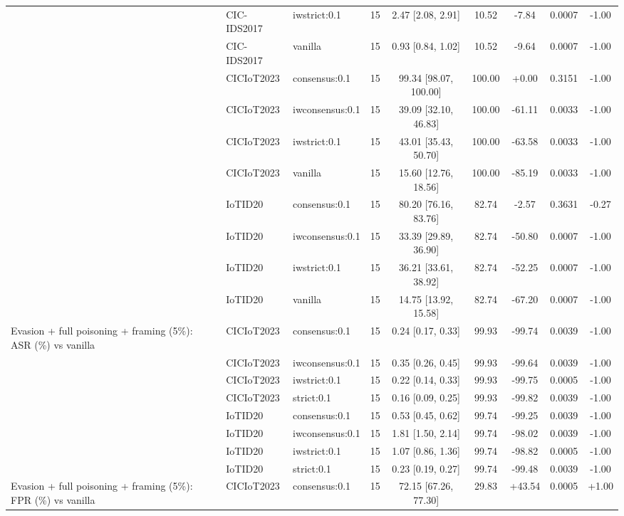 \begin{table}[t]
\begin{tabular}{lllcccccc}
 & CIC-IDS2017 & iwstrict:0.1 & 15 & 2.47 [2.08, 2.91] & 10.52 & -7.84 & 0.0007 & -1.00 \\
 & CIC-IDS2017 & vanilla & 15 & 0.93 [0.84, 1.02] & 10.52 & -9.64 & 0.0007 & -1.00 \\
 & CICIoT2023 & consensus:0.1 & 15 & 99.34 [98.07, 100.00] & 100.00 & +0.00 & 0.3151 & -1.00 \\
 & CICIoT2023 & iwconsensus:0.1 & 15 & 39.09 [32.10, 46.83] & 100.00 & -61.11 & 0.0033 & -1.00 \\
 & CICIoT2023 & iwstrict:0.1 & 15 & 43.01 [35.43, 50.70] & 100.00 & -63.58 & 0.0033 & -1.00 \\
 & CICIoT2023 & vanilla & 15 & 15.60 [12.76, 18.56] & 100.00 & -85.19 & 0.0033 & -1.00 \\
 & IoTID20 & consensus:0.1 & 15 & 80.20 [76.16, 83.76] & 82.74 & -2.57 & 0.3631 & -0.27 \\
 & IoTID20 & iwconsensus:0.1 & 15 & 33.39 [29.89, 36.90] & 82.74 & -50.80 & 0.0007 & -1.00 \\
 & IoTID20 & iwstrict:0.1 & 15 & 36.21 [33.61, 38.92] & 82.74 & -52.25 & 0.0007 & -1.00 \\
 & IoTID20 & vanilla & 15 & 14.75 [13.92, 15.58] & 82.74 & -67.20 & 0.0007 & -1.00 \\
Evasion + full poisoning + framing (5\%): ASR (\%) vs vanilla & CICIoT2023 & consensus:0.1 & 15 & 0.24 [0.17, 0.33] & 99.93 & -99.74 & 0.0039 & -1.00 \\
 & CICIoT2023 & iwconsensus:0.1 & 15 & 0.35 [0.26, 0.45] & 99.93 & -99.64 & 0.0039 & -1.00 \\
 & CICIoT2023 & iwstrict:0.1 & 15 & 0.22 [0.14, 0.33] & 99.93 & -99.75 & 0.0005 & -1.00 \\
 & CICIoT2023 & strict:0.1 & 15 & 0.16 [0.09, 0.25] & 99.93 & -99.82 & 0.0039 & -1.00 \\
 & IoTID20 & consensus:0.1 & 15 & 0.53 [0.45, 0.62] & 99.74 & -99.25 & 0.0039 & -1.00 \\
 & IoTID20 & iwconsensus:0.1 & 15 & 1.81 [1.50, 2.14] & 99.74 & -98.02 & 0.0039 & -1.00 \\
 & IoTID20 & iwstrict:0.1 & 15 & 1.07 [0.86, 1.36] & 99.74 & -98.82 & 0.0005 & -1.00 \\
 & IoTID20 & strict:0.1 & 15 & 0.23 [0.19, 0.27] & 99.74 & -99.48 & 0.0039 & -1.00 \\
Evasion + full poisoning + framing (5\%): FPR (\%) vs vanilla & CICIoT2023 & consensus:0.1 & 15 & 72.15 [67.26, 77.30] & 29.83 & +43.54 & 0.0005 & +1.00 \\

\end{tabular}
\end{table}
